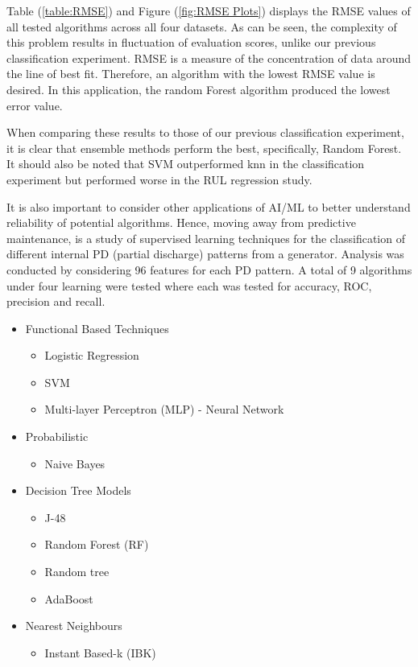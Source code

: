 Table (\ref{table:RMSE}) and Figure (\ref{fig:RMSE Plots}) displays the RMSE values of all tested algorithms across all four datasets.
As can be seen, the complexity of this problem results in fluctuation of evaluation scores, unlike our previous classification experiment.
RMSE is a measure of the concentration of data around the line of best fit. Therefore, an algorithm with the lowest RMSE value is desired.
In this application, the random Forest algorithm produced the lowest error value.

When comparing these results to those of our previous classification experiment, it is clear that ensemble methods perform the best, specifically, Random Forest. 
It should also be noted that SVM outperformed knn in the classification experiment but performed worse in the RUL regression study.

\bigskip
It is also important to consider other applications of AI/ML to better understand reliability of potential algorithms.
Hence, moving away from predictive maintenance, \cite{8300383} is a study of supervised learning techniques for the classification of different internal PD (partial discharge) patterns from a generator.
Analysis was conducted by considering 96 features for each PD pattern.
A total of 9 algorithms under four learning were tested where each was tested for accuracy, ROC, precision and recall.

\begin{itemize}
    \item Functional Based Techniques
    \begin{itemize}
        \item Logistic Regression
        \item SVM
        \item Multi-layer Perceptron (MLP) - Neural Network
    \end{itemize}
    \item Probabilistic
    \begin{itemize}
        \item Naive Bayes
    \end{itemize}
    \item Decision Tree Models
    \begin{itemize}
        \item J-48
        \item Random Forest (RF)
        \item Random tree
        \item AdaBoost
    \end{itemize}
    \item Nearest Neighbours
    \begin{itemize}
        \item Instant Based-k (IBK)
    \end{itemize}
\end{itemize}

